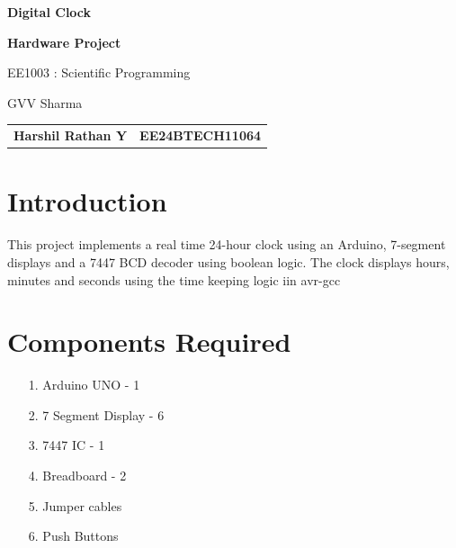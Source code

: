\documentclass[journal]{IEEEtran}
\begin{document}
\begin{titlepage}
    \centering
    {\Huge \bfseries Digital Clock

 \par}
    \vspace{2cm}

   
    {\Large \bfseries Hardware Project \par}
    \vspace{0.5cm}
   
    {\large EE1003 : Scientific Programming \par}
    \vspace{1cm}
    {\large GVV Sharma\par}
    \vspace{3cm}
\begin{tabular}{ll}
    \textbf{Harshil Rathan Y } & \textbf{EE24BTECH11064} \\
\end{tabular}
\end{titlepage}
\newpage
\tableofcontents
\newpage


\vspace{3cm}

\renewcommand{\thefigure}{\theenumi}
\renewcommand{\thetable}{\theenumi}
\setlength{\intextsep}{10pt} %


\renewcommand{\thetable}{\theenumi}
\section{Introduction}
This project implements a real time 24-hour clock using an Arduino, 7-segment displays and a 7447 BCD decoder using boolean logic. The clock displays hours, minutes and seconds using the time keeping logic iin avr-gcc 
\section{Components Required}
\begin{itemize}
    \item[1.] Arduino UNO - 1 
    \item[2.] 7 Segment Display - 6 
    \item[3.] 7447 IC - 1 
    \item[4.] Breadboard - 2 
    \item[5.] Jumper cables 
    \item[6.] Push Buttons  
\end{itemize}
\end{document}
